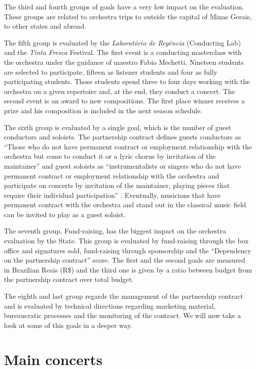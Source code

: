 \documentclass[a4paper, 12pt, openright, oneside, german, french, brazil, english]{abntex2}
\begin{document}
        The third and fourth groups of goals have a very low impact on the evaluation. These groups are related to orchestra trips to outside the capital of Minas Gerais, to other states and abroad.

        The fifth group is evaluated by the \textit{Laboratório de Regência} (Conducting Lab) and the \textit{Tinta Fresca} Festival. The first event is a conducting masterclass with the orchestra under the guidance of maestro Fabio Mechetti. Nineteen students are selected to participate, fifteen as listener students and four as fully participating students. Those students spend three to four days working with the orchestra on a given repertoire and, at the end, they conduct a concert. The second event is an award to new compositions. The first place winner receives a prize and his composition is included in the next season schedule.

        The sixth group is evaluated by a single goal, which is the number of guest conductors and soloists. The partnership contract defines guests conductors as ``Those who do not have permanent contract or employment relationship with the orchestra but come to conduct it or a lyric chorus by invitation of the maintainer'' \cite[p. 40]{minas2017aditivo} and guest soloists as ``instrumentalists or singers who do not have permanent contract or employment relationship with the orchestra and participate on concerts by invitation of the maintainer, playing pieces that require their individual participation'' \cite[p. 40]{minas2017aditivo}. Eventually, musicians that have permanent contract with the orchestra and stand out in the classical music field can be invited to play as a guest soloist.

        The seventh group, Fund-raising, has the biggest impact on the orchestra evaluation by the State. This group is evaluated by fund-raising through the box office and signatures sold, fund-raising through sponsorship and the ``Dependency on the partnership contract'' score. The first and the second goals are measured in Brazilian Reais (R\$) and the third one is given by a ratio between budget from the partnership contract over total budget.

        The eighth and last group regards the management of the partnership contract and is evaluated by technical directions regarding marketing material, bureaucratic processes and the monitoring of the contract. We will now take a look at some of this goals in a deeper way.

        \section{Main concerts}
\end{document}
